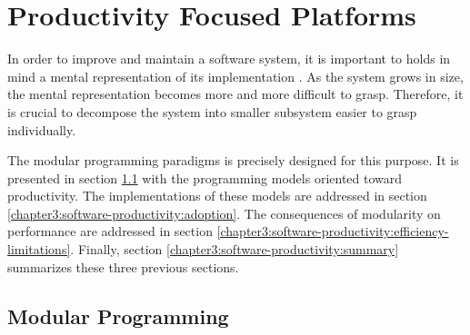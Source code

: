 \section{Productivity Focused Platforms} \label{chapter3:software-productivity}


In order to improve and maintain a software system, it is important to holds in mind a mental representation of its implementation \cite{Simon1962}.
As the system grows in size, the mental representation becomes more and more difficult to grasp.
Therefore, it is crucial to decompose the system into smaller subsystem easier to grasp individually.


The modular programming paradigms is precisely designed for this purpose.
It is presented in section \ref{chapter3:software-productivity:modularity} with the programming models oriented toward productivity.
The implementations of these models are addressed in section \ref{chapter3:software-productivity:adoption}.
The consequences of modularity on performance are addressed in section \ref{chapter3:software-productivity:efficiency-limitations}.
Finally, section \ref{chapter3:software-productivity:summary} summarizes these three previous sections.

\subsection{Modular Programming} \label{chapter3:software-productivity:modularity}

\begin{figure}
%
\end{figure}

